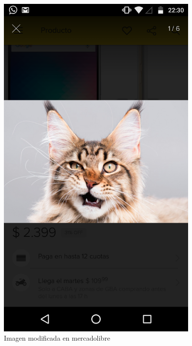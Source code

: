 \begin{figure}
    \centering
    \includegraphics[width=10cm]{img/cat.png}
    \caption{Imagen modificada en mercadolibre}
\end{figure}